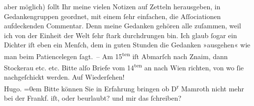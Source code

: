 \begin{ledgroupsized}[t]{13cm}
                        {\pb}aber möglich) ſollt Ihr
                    meine vielen Notizen auf Zetteln herausgeben, in Gedankengruppen geordnet, mit
                    einem ſehr einfachen, die Aſſociationen aufdeckenden Commentar. Denn meine
                    Gedanken gehören alle zuſammen, weil ich von der Einheit der Welt ſehr ſtark
                    durchdrungen bin. Ich glaub ſogar ein Dichter iſt eben ein Menſch, dem in guten
                    Stunden die Gedanken »ausgehen« wie man beim Patiencelegen ſagt. – Am
                            15\textsuperscript{ten} iſt Abmarſch {\pb}nach
                        Znaim, dann Stockerau etc. etc. Bitte alſo Briefe vom 14\textsuperscript{ten} an nach Wien richten, von wo ſie
                    nachgeſchickt werden.\pend
           \pstart
           Auf Wiederſehen!{\\[\baselineskip]}\spacefill\mbox{Hugo.}\pend
           \leftskip=0em{}\pstart
           \noindent{}Bitte können Sie in Erfahrung bringen ob D\textsuperscript{r}{ }Mamroth nicht mehr bei der Frankf. iſt, oder beurlaubt? und mir das
                        ſchreiben? \pend
           \endnumbering{}\end{ledgroupsized}  \newcommand{\dateiname}{L00471}\newcommand{\titel}{Hugo von Hofmannsthal an Arthur Schnitzler, 9. 8. [1895]}\newcommand{\editorInnen}{Martin Anton Müller und Gerd-Hermann Susen}
      